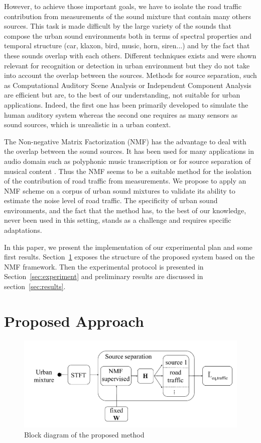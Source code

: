 \documentclass{article}
\begin{document}
\begin{sloppy}
However, to achieve those important goals, we have to isolate the road traffic contribution from measurements  of the sound mixture that contain many others sources. This task is made difficult by the large variety of the sounds that compose the urban sound environments both in terms of spectral properties and temporal structure (car, klaxon, bird, music, horn, siren...) and by the fact that these sounds overlap with each others. Different techniques exists and were shown relevant for recognition or detection in urban environment \cite{Aucouturier} \cite{defreville} but they do not take into account the overlap between the sources. Methods for source separation, such as Computational Auditory Scene Analysis \cite{brown} or Independent Component Analysis \cite{comon} are efficient but are, to the best of our understanding, not suitable for urban applications. Indeed, the first one has been primarily developed to simulate the human auditory system whereas the second one requires as many sensors as sound sources, which is unrealistic in a urban context.

The Non-negative Matrix Factorization (NMF) \cite{lee1999} has the advantage to deal with the overlap between the sound sources. It has been used for many applications in audio domain such as polyphonic music transcription \cite{smaragdis2003} or for source separation of musical content \cite{Virtanen2005}. Thus the NMF seems to be a suitable method for the isolation of the contribution of road traffic from measurements. We propose to apply an NMF scheme on a corpus of urban sound mixtures to validate its ability to estimate the noise level of road traffic. The specificity of urban sound environments, and the fact that the method has, to the best of our knowledge, never been used in this setting, stands as a challenge and requires specific adaptations.

In this paper, we present the implementation of our experimental plan and some first results. Section~\ref{sec:method} exposes the structure of the proposed system based on the NMF framework. Then the experimental protocol is presented in Section~\ref{sec:experiment} and preliminary results are discussed in section~\ref{sec:results}.


\section{Proposed Approach}\label{sec:method}

\begin{figure}[!ht]
\centering
\includegraphics[width=.7\textwidth]{images/bloc1.pdf}
\caption{Block diagram of the proposed method \label{block}}
\end{figure}


\end{sloppy}
\end{document}
